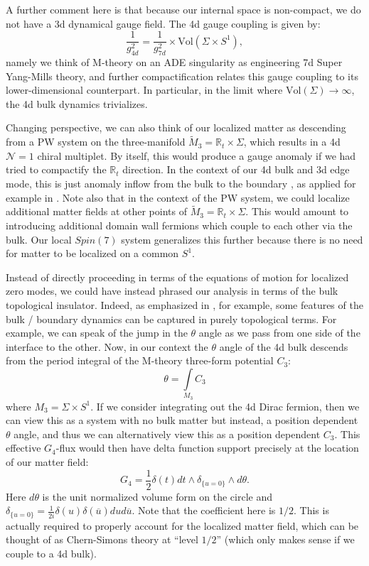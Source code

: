 \documentclass[12pt]{article}%
\numberwithin{equation}{section}
\renewcommand{\(}{\left(}
\renewcommand{\)}{\right)}
\renewcommand{\[}{\left[}
\renewcommand{\]}{\right]}
\begin{document}
A further comment here is that because our internal space is non-compact, we do not have a 3d dynamical gauge field.
The 4d gauge coupling is given by:
\begin{equation}
\frac{1}{g^2_{4d}} = \frac{1}{g^{2}_{7d}} \times \mathrm{Vol}(\Sigma \times S^1),
\end{equation}
namely we think of M-theory on an ADE singularity as engineering 7d Super Yang-Mills theory, and further compactification relates this gauge coupling to its lower-dimensional counterpart. In particular, in the limit where $\mathrm{Vol}(\Sigma) \rightarrow \infty$, the 4d bulk dynamics trivializes.

Changing perspective, we can also think of our localized matter as descending from a PW system on the three-manifold $\widetilde{M}_3 = \mathbb{R}_t \times \Sigma$, which results in a 4d $\mathcal{N} = 1$ chiral multiplet. By itself, this would produce a gauge anomaly if we had tried to compactify the $\mathbb{R}_t$ direction. In the context of our 4d bulk and 3d edge mode, this is just anomaly inflow from the bulk to the boundary \cite{Callan:1984sa}, as applied for example in \cite{Acharya:2001gy, Acharya:2002vs}. Note also that in the context of the PW system, we could localize additional matter fields at other points of $\widetilde{M}_3 = \mathbb{R}_t \times \Sigma$. This would amount to introducing additional domain wall fermions  which couple to each other via the bulk. Our local $Spin(7)$ system generalizes this further because there is no need for matter to be localized on a common $S^1$.

Instead of directly proceeding in terms of the equations of motion for localized zero modes, we could have instead phrased our analysis in terms of the bulk topological insulator. Indeed, as emphasized in \cite{Seiberg:2016rsg, Seiberg:2016gmd}, for example, some features of the bulk / boundary dynamics can be captured in purely topological terms. For example, we can speak of the jump in the $\theta$ angle as we pass from one side of the interface to the other. Now, in our context the $\theta$ angle of the 4d bulk descends from the period integral of the M-theory three-form potential $C_3$:
\begin{equation}
\theta = \underset{M_3}{\int} C_3
\end{equation}
where $M_3 = \Sigma \times S^1$. If we consider integrating out the 4d Dirac fermion, then we can view this as a system with no bulk matter but instead, a position dependent $\theta$ angle, and thus we can alternatively view this as a position dependent $C_3$. This effective $G_4$-flux would then have delta function support precisely at the location of our matter field:
\begin{equation}
G_4 = \frac{1}{2} \delta(t)dt \wedge \delta_{\{u=0\}} \wedge d \theta.
\end{equation}
Here $d \theta$ is the unit normalized volume form on the circle and $\delta_{\{u=0\}}=\frac{1}{2i}\delta(u)\delta(\overline{u})dud\overline{u}$. Note that the coefficient here is $1/2$. This is actually required to properly account for the localized matter field, which can be thought of as  Chern-Simons theory at ``level $1/2$'' (which only makes sense if we couple to a 4d bulk).
\end{document}

